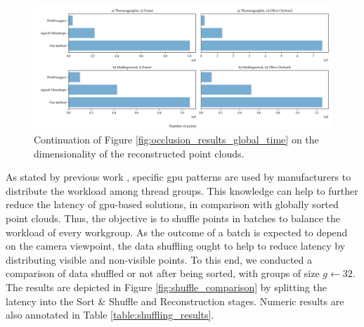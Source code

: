 \begin{figure}
    \ContinuedFloat
    \centering
    \includegraphics[width=\linewidth]{figs/multi_thermal_projection/results/point_cloud_size.png}
    \caption{Continuation of Figure \ref{fig:occlusion_results_global_time} on the dimensionality of the reconstructed point clouds. }
    \label{fig:occlusion_point_cloud_size}
\end{figure}

As stated by previous work \cite{schutz_rendering_2021, kerbl_effective_2017}, specific \acrshort{gpu} patterns are used by manufacturers to distribute the workload among thread groups. This knowledge can help to further reduce the latency of \acrshort{gpu}-based solutions, in comparison with globally sorted point clouds. Thus, the objective is to shuffle points in batches to balance the workload of every workgroup. As the outcome of a batch is expected to depend on the camera viewpoint, the data shuffling ought to help to reduce latency by distributing visible and non-visible points. To this end, we conducted a comparison of data shuffled or not after being sorted, with groups of size $g \gets 32$. The results are depicted in Figure \ref{fig:shuffle_comparison} by splitting the latency into the Sort \& Shuffle and Reconstruction stages. Numeric results are also annotated in Table \ref{table:shuffling_results}.

